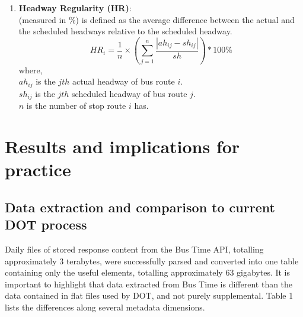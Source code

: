 \documentclass[12pt,journal,compsoc]{IEEEtran}
\begin{document}
\begin{enumerate}
\item \textbf{Headway Regularity (HR)}:\\
(measured in $\%$) is defined as the average difference between the actual and the scheduled headways relative to the scheduled headway. 
$$HR_i = \frac{1}{n}\times\left( \sum_{j=1}^n \frac{|ah_{ij}-sh_{ij}|}{sh} \right) * 100\%$$
where,\\
$ah_{ij}$ is the $jth$ actual headway of bus route $i$.\\
$sh_{ij}$ is the $jth$ scheduled headway of bus route $j$.\\
$n$ is the number of stop route $i$ has.\\
\end{enumerate}
 


\section{Results and implications for practice}

\subsection{Data extraction and comparison to current DOT process}

Daily files of stored response content from the Bus Time API, totalling approximately 3 terabytes, were successfully parsed and converted into one table containing only the useful elements, totalling approximately 63 gigabytes.  It is important to highlight that data extracted from Bus Time is different than the data contained in flat files used by DOT, and not purely supplemental.  Table 1 lists the differences along several metadata dimensions.


\vspace{0.5cm}

\end{document}
